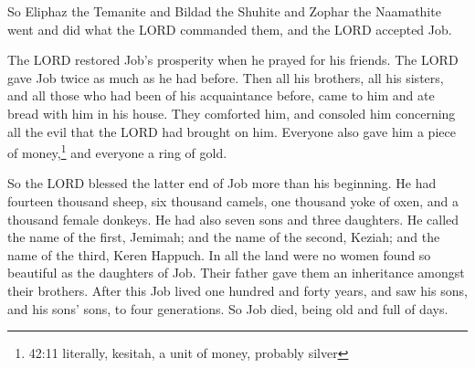  So Eliphaz the Temanite and Bildad the Shuhite and Zophar
the Naamathite went and did what the LORD commanded them, and the LORD
accepted Job.

 The LORD restored Job's prosperity when he prayed for his
friends. The LORD gave Job twice as much as he had before. 
Then all his brothers, all his sisters, and all those who had been of
his acquaintance before, came to him and ate bread with him in his
house. They comforted him, and consoled him concerning all the evil that
the LORD had brought on him. Everyone also gave him a piece of
money,\footnote{42:11 literally, kesitah, a unit of money, probably
  silver} and everyone a ring of gold.

 So the LORD blessed the latter end of Job more than his
beginning. He had fourteen thousand sheep, six thousand camels, one
thousand yoke of oxen, and a thousand female donkeys.  He
had also seven sons and three daughters.  He called the
name of the first, Jemimah; and the name of the second, Keziah; and the
name of the third, Keren Happuch.  In all the land were no
women found so beautiful as the daughters of Job. Their father gave them
an inheritance amongst their brothers.  After this Job
lived one hundred and forty years, and saw his sons, and his sons' sons,
to four generations.  So Job died, being old and full of
days.
